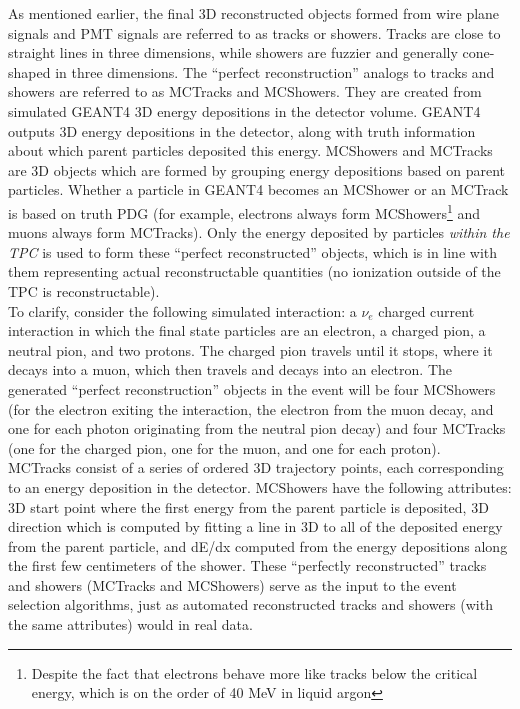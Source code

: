 As mentioned earlier, the final 3D reconstructed objects formed from wire plane signals and PMT signals are referred to as tracks or showers. Tracks are close to straight lines in three dimensions, while showers are fuzzier and generally cone-shaped in three dimensions. The ``perfect reconstruction'' analogs to tracks and showers are referred to as {\sc MCTracks} and {\sc MCShowers}. They are created from simulated {\sc GEANT4} 3D energy depositions in the detector volume. {\sc GEANT4} outputs 3D energy depositions in the detector, along with truth information about which parent particles deposited this energy. {\sc MCShowers} and {\sc MCTracks} are 3D objects which are formed by grouping energy depositions based on parent particles. Whether a particle in {\sc GEANT4} becomes an {\sc MCShower} or an {\sc MCTrack} is based on truth PDG (for example, electrons always form {\sc MCShower}s\footnote{Despite the fact that electrons behave more like tracks below the critical energy, which is on the order of 40 MeV in liquid argon} and muons always form {\sc MCTrack}s). Only the energy deposited by particles \textit{within the TPC} is used to form these ``perfect reconstructed'' objects, which is in line with them representing actual reconstructable quantities (no ionization outside of the TPC is reconstructable).\\

To clarify, consider the following simulated interaction: a $\nu_e$ charged current interaction in which the final state particles are an electron, a charged pion, a neutral pion, and two protons. The charged pion travels until it stops, where it decays into a muon, which then travels and decays into an electron. The generated ``perfect reconstruction'' objects in the event will be four {\sc MCShower}s (for the electron exiting the interaction, the electron from the muon decay, and one for each photon originating from the neutral pion decay) and four {\sc MCTracks} (one for the charged pion, one for the muon, and one for each proton).\\

{\sc MCTracks} consist of a series of ordered 3D trajectory points, each corresponding to an energy deposition in the detector. {\sc MCShowers} have the following attributes: 3D start point where the first energy from the parent particle is deposited, 3D direction which is computed by fitting a line in 3D to all of the deposited energy from the parent particle, and dE/dx computed from the energy depositions along the first few centimeters of the shower. These ``perfectly reconstructed'' tracks and showers ({\sc MCTracks} and {\sc MCShowers}) serve as the input to the event selection algorithms, just as automated reconstructed tracks and showers (with the same attributes) would in real data.\\




